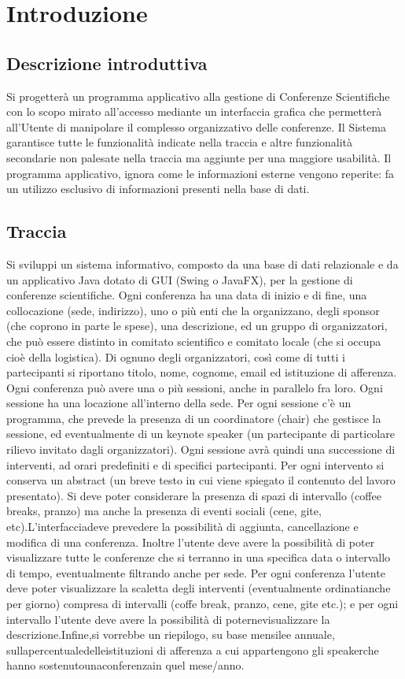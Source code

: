 \documentclass[a4paper,italian,10pt,openany]{book}
\begin{document}
    \chapter{Introduzione}
    \section{Descrizione introduttiva}
	Si progetterà un programma applicativo alla gestione di Conferenze Scientifiche con lo scopo mirato all'accesso mediante un interfaccia grafica che permetterà all'Utente di manipolare il complesso organizzativo delle conferenze. Il Sistema garantisce tutte le funzionalità indicate nella traccia e altre funzionalità secondarie non palesate nella traccia ma aggiunte per una maggiore usabilità. Il programma applicativo, ignora come le informazioni esterne vengono reperite: fa un utilizzo esclusivo di informazioni presenti nella base di dati.
	\section{Traccia}
	Si sviluppi un sistema informativo, composto da una base di dati relazionale e da un applicativo Java dotato di GUI (Swing o JavaFX), per la gestione di conferenze scientifiche. Ogni conferenza ha una data di inizio e di fine, una collocazione (sede, indirizzo), uno o più enti che la organizzano, degli sponsor (che coprono in parte le spese), una descrizione, ed un gruppo di organizzatori, che può essere distinto in comitato scientifico e comitato  locale  (che  si  occupa  cioè  della  logistica).  Di  ognuno  degli  organizzatori,  così  come  di  tutti  i partecipanti si riportano titolo, nome, cognome, email ed istituzione di afferenza. Ogni conferenza può avere una o più sessioni, anche in parallelo fra loro. Ogni sessione ha una locazione all'interno della sede. Per ogni sessione c'è un programma, che prevede la presenza di un coordinatore (chair) che gestisce la sessione, ed eventualmente di un keynote speaker (un partecipante di particolare rilievo invitato dagli organizzatori). Ogni sessione  avrà  quindi  una  successione  di  interventi,  ad  orari  predefiniti  e  di  specifici  partecipanti.  Per  ogni intervento si conserva un abstract (un breve testo in cui viene spiegato il contenuto del lavoro presentato). Si deve poter considerare la presenza di spazi di intervallo (coffee breaks, pranzo) ma anche la presenza di eventi sociali (cene, gite, etc).L’interfacciadeve prevedere la possibilità di aggiunta, cancellazione e modifica di una conferenza. Inoltre l’utente deve avere la possibilità di poter visualizzare tutte le conferenze che si terranno  in  una  specifica  data  o  intervallo  di  tempo,  eventualmente  filtrando  anche  per  sede.  Per  ogni conferenza l’utente deve poter visualizzare la scaletta degli interventi (eventualmente ordinatianche  per giorno) compresa di intervalli (coffe break, pranzo, cene, gite etc.); e per ogni intervallo l’utente deve avere la possibilità di poternevisualizzare la descrizione.Infine,si vorrebbe un riepilogo, su base mensilee annuale, sullapercentualedelleistituzioni  di  afferenza a  cui  appartengono  gli  speakerche  hanno  sostenutounaconferenzain quel mese/anno.
\end{document}
